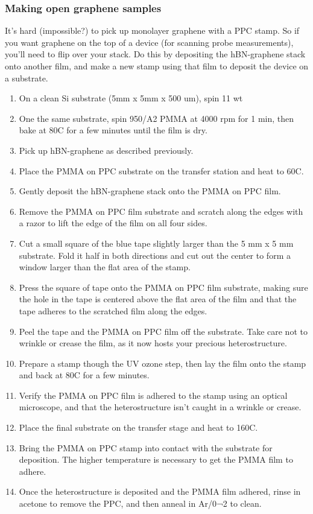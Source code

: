 \begin{appendices}
\subsubsection{Making open graphene samples}	
It’s hard (impossible?) to pick up monolayer graphene with a PPC stamp. So if you want graphene on the top of a device (for scanning probe measurements), you’ll need to flip over your stack. Do this by depositing the hBN-graphene stack onto another film, and make a new stamp using that film to deposit the device on a substrate.
\begin{enumerate}
	\item On a clean Si substrate (5mm x 5mm x 500 um), spin 11 wt%
	\item One the same substrate, spin 950/A2 PMMA at 4000 rpm for 1 min, then bake at 80C for a few minutes until the film is dry.
	\item Pick up hBN-graphene as described previously.
	\item Place the PMMA on PPC substrate on the transfer station and heat to 60C.
	\item Gently deposit the hBN-graphene stack onto the PMMA on PPC film.
	\item Remove the PMMA on PPC film substrate and scratch along the edges with a razor to lift the edge of the film on all four sides.
	\item Cut a small square of the blue tape slightly larger than the 5 mm x 5 mm substrate. Fold it half in both directions and cut out the center to form a window larger than the flat area of the stamp.
	\item Press the square of tape onto the PMMA on PPC film substrate, making sure the hole in the tape is centered above the flat area of the film and that the tape adheres to the scratched film along the edges.
	\item Peel the tape and the PMMA on PPC film off the substrate. Take care not to wrinkle or crease the film, as it now hosts your precious heterostructure.
	\item Prepare a stamp though the UV ozone step, then lay the film onto the stamp and back at 80C for a few minutes.
	\item Verify the PMMA on PPC film is adhered to the stamp using an optical microscope, and that the heterostructure isn’t caught in a wrinkle or crease.
	\item Place the final substrate on the transfer stage and heat to 160C.
	\item Bring the PMMA on PPC stamp into contact with the substrate for deposition. The higher temperature is necessary to get the PMMA film to adhere.
	\item Once the heterostructure is deposited and the PMMA film adhered, rinse in acetone to remove the PPC, and then anneal in Ar/0¬2 to clean.
\end{enumerate}


\end{appendices}
